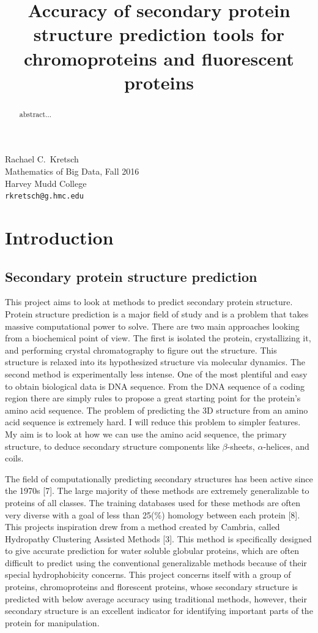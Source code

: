\documentclass{article}
\title{Accuracy of secondary protein structure prediction tools for chromoproteins and fluorescent proteins}
\begin{document}

 Rachael C.~Kretsch \\
 Mathematics of Big Data, Fall 2016\\
 Harvey Mudd College\\
 \texttt{rkretsch@g.hmc.edu} \\

\maketitle

\begin{abstract}
   abstract...
\end{abstract}

\section{Introduction}

\subsection{Secondary protein structure prediction}

This project aims to look at methods to predict secondary protein structure. Protein structure prediction is a major field of study and is a problem that takes massive computational power to solve. There are two main approaches looking from a biochemical point of view. The first is isolated the protein, crystallizing it, and performing crystal chromatography to figure out the structure. This structure is relaxed into its hypothesized structure via molecular dynamics. The second method is experimentally less intense. One of the most plentiful and easy to obtain biological data is DNA sequence. From the DNA sequence of a coding region there are simply rules to propose a great starting point for the protein's amino acid sequence. The problem of predicting the 3D structure from an amino acid sequence is extremely hard. I will reduce this problem to simpler features. My aim is to look at how we can use the amino acid sequence, the primary structure, to deduce secondary structure components like $\beta$-sheets, $\alpha$-helices, and coils. 

The field of computationally predicting secondary structures has been active since the 1970s [7]. The large majority of these methods are extremely generalizable to proteins of all classes. The training databases used for these methods are often very diverse with a goal of less than 25(\%) homology between each protein [8]. This projects inspiration drew from a method created by Cambria, called Hydropathy Clustering Assisted Methods [3]. This method is specifically designed to give accurate prediction for water soluble globular proteins, which are often difficult to predict using the conventional generalizable methods because of their special hydrophobicity concerns. This project concerns itself with a group of proteins, chromoproteins and florescent proteins, whose secondary structure is predicted with below average accuracy using traditional methods, however, their secondary structure is an excellent indicator for identifying important parts of the protein for manipulation.
\end{document}
